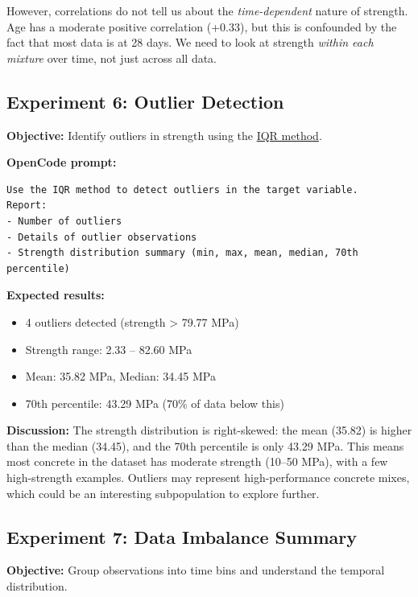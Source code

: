\documentclass[11pt]{article}
\begin{document}
However, correlations do not tell us about the \emph{time-dependent} nature of strength.  Age has a moderate positive correlation (+0.33), but this is confounded by the fact that most data is at 28 days.  We need to look at strength \emph{within each mixture} over time, not just across all data.

\subsection{Experiment 6: Outlier Detection}
\label{sec:experiment-6}

\textbf{Objective:} Identify outliers in strength using the \href{https://en.wikipedia.org/wiki/Interquartile_range}{IQR method}.

\textbf{OpenCode prompt:}
\begin{lstlisting}[style=term]
Use the IQR method to detect outliers in the target variable.
Report:
- Number of outliers
- Details of outlier observations
- Strength distribution summary (min, max, mean, median, 70th percentile)
\end{lstlisting}

\textbf{Expected results:}
\begin{itemize}[nosep]
  \item 4 outliers detected (strength > 79.77 MPa)
  \item Strength range: 2.33 -- 82.60 MPa
  \item Mean: 35.82 MPa, Median: 34.45 MPa
  \item 70th percentile: 43.29 MPa (70\% of data below this)
\end{itemize}

\textbf{Discussion:}
The strength distribution is right-skewed: the mean (35.82) is higher than the median (34.45), and the 70th percentile is only 43.29 MPa.  This means most concrete in the dataset has moderate strength (10--50 MPa), with a few high-strength examples.  Outliers may represent high-performance concrete mixes, which could be an interesting subpopulation to explore further.

\subsection{Experiment 7: Data Imbalance Summary}
\label{sec:experiment-7}

\textbf{Objective:} Group observations into time bins and understand the temporal distribution.
\end{document}
